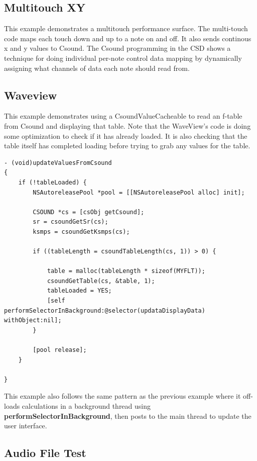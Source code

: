 \documentclass[11pt]{article}
\begin{document}
\subsection{Multitouch XY}

This example demonstrates a multitouch performance surface. The multi-touch code maps each touch down and up to a note on and off.  It also sends continous x and y values to Csound.  The Csound programming in the CSD shows a technique for doing individual per-note control data mapping by dynamically assigning what channels of data each note should read from. 

\subsection{Waveview}

This example demonstrates using a CsoundValueCacheable to read an f-table from Csound and displaying that table.  Note that the WaveView's code is doing some optimization to check if it has already loaded.  It is also checking that the table itself has completed loading before trying to grab any values for the table. 

\begin{lstlisting}[caption=Waveview code demonstrating reading f-tables from Csound]
- (void)updateValuesFromCsound
{
    if (!tableLoaded) {
        NSAutoreleasePool *pool = [[NSAutoreleasePool alloc] init];

        CSOUND *cs = [csObj getCsound];
        sr = csoundGetSr(cs);
        ksmps = csoundGetKsmps(cs);
        
        if ((tableLength = csoundTableLength(cs, 1)) > 0) {

            table = malloc(tableLength * sizeof(MYFLT));
            csoundGetTable(cs, &table, 1);
            tableLoaded = YES;
            [self performSelectorInBackground:@selector(updataDisplayData) withObject:nil];
        }

        [pool release];
    }

}
\end{lstlisting}

This example also follows the same pattern as the previous example where it off-loads calculations in a background thread using \textbf{performSelectorInBackground}, then posts to the main thread to update the user interface.

\subsection{Audio File Test}
\end{document}
